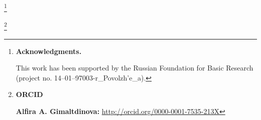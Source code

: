\RuDate



\newpage



\makeentitle











\thanks{\textbf{Acknowledgments.}

This work has been supported by the Russian Foundation for Basic Research (project no. 14–01–97003-r\_Povolzh'e\_a).

}





\thanks{{\bf ORCID}



{\bf Alfira A. Gimaltdinova:}    \url{http://orcid.org/0000-0001-7535-213X}





}













\EngRef



